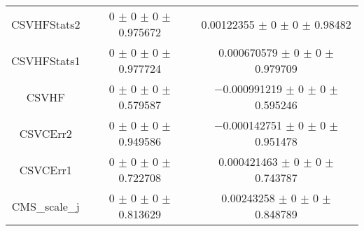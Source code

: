 \begin{table}
\begin{tabular}{ccc}
CSVHFStats2 	& \num{0} $\pm$ \num{0} $\pm$ \num{0} $\pm$ \num{0.975672} 	& \num{0.00122355} $\pm$ \num{0} $\pm$ \num{0} $\pm$ \num{0.98482}\\
CSVHFStats1 	& \num{0} $\pm$ \num{0} $\pm$ \num{0} $\pm$ \num{0.977724} 	& \num{0.000670579} $\pm$ \num{0} $\pm$ \num{0} $\pm$ \num{0.979709}\\
CSVHF 	& \num{0} $\pm$ \num{0} $\pm$ \num{0} $\pm$ \num{0.579587} 	& \num{-0.000991219} $\pm$ \num{0} $\pm$ \num{0} $\pm$ \num{0.595246}\\
CSVCErr2 	& \num{0} $\pm$ \num{0} $\pm$ \num{0} $\pm$ \num{0.949586} 	& \num{-0.000142751} $\pm$ \num{0} $\pm$ \num{0} $\pm$ \num{0.951478}\\
CSVCErr1 	& \num{0} $\pm$ \num{0} $\pm$ \num{0} $\pm$ \num{0.722708} 	& \num{0.000421463} $\pm$ \num{0} $\pm$ \num{0} $\pm$ \num{0.743787}\\
CMS\_scale\_j 	& \num{0} $\pm$ \num{0} $\pm$ \num{0} $\pm$ \num{0.813629} 	& \num{0.00243258} $\pm$ \num{0} $\pm$ \num{0} $\pm$ \num{0.848789}\\
\bottomrule
\end{tabular}
\end{table}